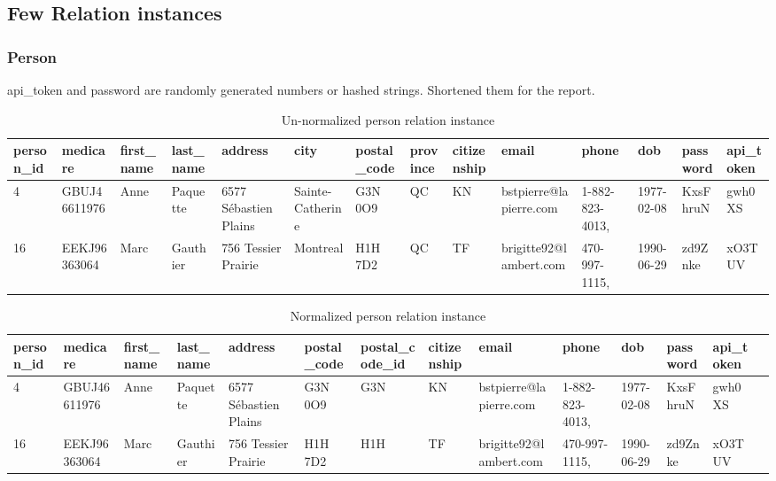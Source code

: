 \subsection{Few Relation instances}
\subsubsection{Person}
api\_token and password are randomly generated numbers or hashed strings. Shortened them for the report.
\begin{table}[H]
\centering
\begin{adjustbox}{width=1.2\textwidth,center=\textwidth}
\begin{tabular}{|l|l|l|l|l|l|l|l|l|l|l|l|l|l|} 
        \hline
        person\_id & medicare & first\_name & last\_name & address & city & postal\_code & province & citizenship & email & phone & dob & password & api\_token \\
        \hline 
4 & GBUJ46611976 & Anne & Paquette & 6577 Sébastien Plains & Sainte-Catherine & G3N 0O9 & QC & KN & bstpierre@lapierre.com & 1-882-823-4013, & 1977-02-08 & KxsFhruN & gwh0XS \\    
16 & EEKJ96363064 & Marc & Gauthier & 756 Tessier Prairie & Montreal & H1H 7D2 & QC & TF & brigitte92@lambert.com & 470-997-1115, & 1990-06-29 & zd9Znke & xO3TUV\\        
        \hline
\end{tabular}
\end{adjustbox}
\caption{Un-normalized person relation instance}
\end{table}
\begin{table}[H]
\centering
\begin{adjustbox}{width=1.2\textwidth,center=\textwidth}
\begin{tabular}{|l|l|l|l|l|l|l|l|l|l|l|l|l|l|} 
        \hline
        person\_id & medicare & first\_name & last\_name & address & postal\_code & postal\_code\_id & citizenship & email & phone & dob & password & api\_token \\
        \hline 
4 & GBUJ46611976 & Anne & Paquette & 6577 Sébastien Plains & G3N 0O9 & G3N & KN & bstpierre@lapierre.com & 1-882-823-4013, & 1977-02-08 & KxsFhruN & gwh0XS \\    
16 & EEKJ96363064 & Marc & Gauthier & 756 Tessier Prairie & H1H 7D2 & H1H & TF & brigitte92@lambert.com & 470-997-1115, & 1990-06-29 & zd9Znke & xO3TUV\\        
        \hline
\end{tabular}
\end{adjustbox}
\caption{Normalized person relation instance}
\end{table}


